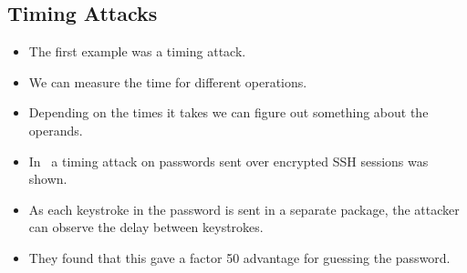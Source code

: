 \documentclass{beamer}
\begin{document}
\subsection{Timing Attacks}

\begin{frame}
  \begin{itemize}
    \item The first example was a timing attack.
    \item We can measure the time for different operations.
    \item Depending on the times it takes we can figure out something about the 
      operands.
  \end{itemize}
\end{frame}

\begin{frame}
  \begin{example}
    \begin{itemize}
      \item In~\cite{song2001timing} a timing attack on passwords sent over 
        encrypted SSH sessions was shown.

      \item As each keystroke in the password is sent in a separate package, 
        the attacker can observe the delay between keystrokes.

      \item They found that this gave a factor 50 advantage for guessing the 
        password.
    \end{itemize}
  \end{example}
\end{frame}
\end{document}
